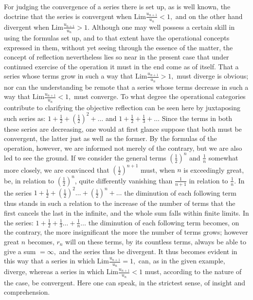 \documentclass[12pt,a4paper,openany]{book}
\newcommand{\opage}[1]{\marginnote{\footnotesize\textit{[#1]}}}
\begin{document}
For judging the convergence of a series there is set up, as is well known, the doctrine that the series is convergent when $\mathrm{Lim}\frac{u_{n+1}}{u_{n}}<1,$ and on the other hand divergent when $\mathrm{Lim}\frac{u_{n+1}}{u_{n}}>1.$ Although one may well possess a certain skill in using the formulas set up, and to that extent have the operational concepts expressed in them, without yet seeing through the essence of the matter, the concept of reflection nevertheless lies so near in the present case that under continued exercise of the operation it must in the end come as of itself. That a series whose terms grow in such a way that $\mathrm{Lim}\frac{u_{n+1}}{u_{n}}>1,$ must
diverge is obvious; nor can the understanding be remote that a series whose terms decrease in such a way that
\setcounter{footnote}{0}%
\opage{66}$\mathrm{Lim}\frac{u_{n+1}}{u_{n}}<1,$ must converge. To what degree the operational categories contribute to clarifying the objective reflection can be seen here by juxtaposing such series as: $1+\frac{1}{2}+\left(\frac{1}{2}\right)^{2}+\ldots$ and $1+\frac{1}{2}+\frac{1}{3}+\ldots$ Since the terms in both these series are decreasing, one would at first glance suppose that both must be convergent, the latter just as well as the former. By the formulas of the operation, however, we are informed not merely of the contrary, but we are also led to see the ground. If we consider the general terms $\left(\frac{1}{2}\right)^{n}$ and $\frac{1}{n}$ somewhat more closely, we are convinced that $\left(\frac{1}{2}\right)^{n+1}$ must, when $n$ is exceedingly great, be, in relation to $\left(\frac{1}{2}\right)^{n}$, quite differently vanishing than $\frac{1}{n+1}$ in relation to $\frac{1}{n}.$ In the series $1+\frac{1}{2}+\left(\frac{1}{2}\right)^{2}\ldots+\left(\frac{1}{2}\right)^{n}+\ldots$ the diminution of each following term thus stands in such a relation to the increase of the number of terms that the first cancels the last in the infinite, and the whole sum falls within finite limits. In the series: $1+\frac{1}{2}+\frac{1}{3}\ldots+\frac{1}{n}\ldots$ the diminution of each following term becomes, on the contrary, the more insignificant the more the number of terms grows; however great $n$ becomes, $r_{n}$ will on these terms, by its countless terms, always be able to give a sum $=\infty,$ and the series thus be divergent. It thus becomes evident in this way that a series in which $\mathrm{Lim}\frac{u_{n+1}}{u_{n}}=1,$ can, as in the given example, diverge, whereas a series in which $\mathrm{Lim}\frac{u_{n+1}}{u_{n}}<1$ must, according to the nature of the case,
\setcounter{footnote}{0}%
\opage{67}be convergent. Here one can speak, in the strictest sense, of insight and comprehension.
\end{document}

